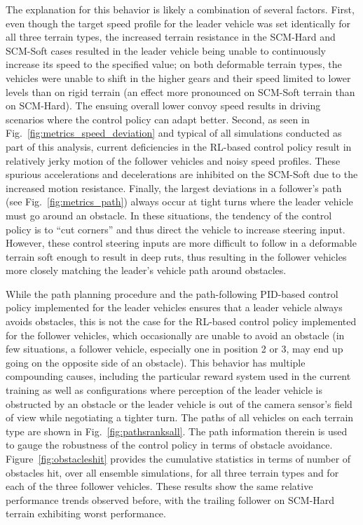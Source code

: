 \documentclass[12pt,twocolumn]{article}
\begin{document}
The explanation for this behavior is likely a combination of several factors.  First, even though the target speed profile for the leader vehicle was set identically for all three terrain types, the increased terrain resistance in the SCM-Hard and SCM-Soft cases resulted in the leader vehicle being unable to continuously increase its speed to the specified value; on both deformable terrain types, the vehicles were unable to shift in the higher gears and their speed limited to lower levels than on rigid terrain (an effect more pronounced on SCM-Soft terrain than on SCM-Hard). The ensuing overall lower convoy speed results in driving scenarios where the control policy can adapt better.  
%
Second, as seen in Fig.~\ref{fig:metrics_speed_deviation} and typical of all simulations conducted as part of this analysis, current deficiencies in the RL-based control policy result in relatively jerky motion of the follower vehicles and noisy speed profiles.  These spurious accelerations and decelerations are inhibited on the SCM-Soft due to the increased motion resistance.
%
Finally, the largest deviations in a follower's path (see Fig.~\ref{fig:metrics_path}) always occur at tight turns where the leader vehicle must go around an obstacle.  In these situations, the tendency of the control policy is to ``cut corners'' and thus direct the vehicle to increase steering input.  However, these control steering inputs are more difficult to follow in a deformable terrain soft enough to result in deep ruts, thus resulting in the follower vehicles more closely matching the leader's vehicle path around obstacles.


While the path planning procedure and the path-following PID-based control policy implemented for the leader vehicles ensures that a leader vehicle always avoids obstacles, this is not the case for the RL-based control policy implemented for the follower vehicles, which occasionally are unable to avoid an obstacle (in few situations, a follower vehicle, especially one in position 2 or 3, may end up going on the opposite side of an obstacle).  This behavior has multiple compounding causes, including the particular reward system used in the current training as well as configurations where perception of the leader vehicle is obstructed by an obstacle or the leader vehicle is out of the camera sensor's field of view while negotiating a tighter turn.
%
The paths of all vehicles on each terrain type are shown in Fig.~\ref{fig:pathsranksall}. The path information therein is used to gauge the robustness of the control policy in terms of obstacle avoidance. Figure~\ref{fig:obstacleshit} provides the cumulative statistics in terms of number of obstacles hit, over all ensemble simulations, for all three terrain types and for each of the three follower vehicles.  These results show the same relative performance trends observed before, with the trailing follower on SCM-Hard terrain exhibiting worst performance. 
\end{document}
